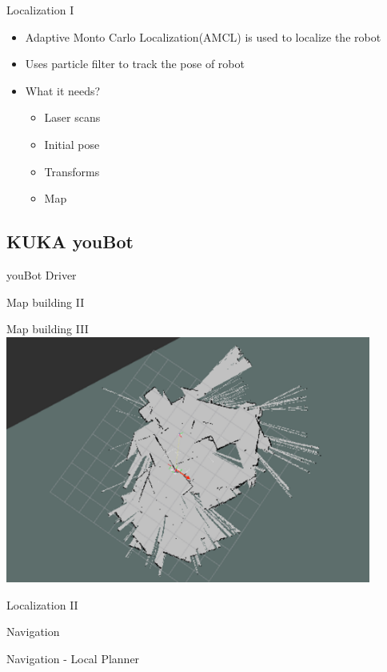 \documentclass[12pt,aspectratio=43,xcolor={usenames,dvipsnames,table}]{beamer}
\begin{document}
\begin{frame}{Localization I}
\begin{itemize}
	\item Adaptive Monto Carlo Localization(AMCL) is used to localize the robot
	\item Uses particle filter to track the pose of robot
	\item What it needs?
		\begin{itemize}
			\item Laser scans
			\item Initial pose
			\item Transforms
			\item Map 
		\end{itemize}
\end{itemize}
\end{frame}
\subsection{KUKA youBot}
\begin{frame}{youBot Driver}
\end{frame}
\begin{frame}{Map building II}
\end{frame}
\begin{frame}{Map building III}
    \centering
    \includegraphics[width=0.9\textwidth]{gfx/map_messy.png}
\end{frame}
\begin{frame}{Localization II}
\end{frame}
\begin{frame}{Navigation}
\end{frame}
\begin{frame}{Navigation - Local Planner}
\end{frame}
\end{document}
